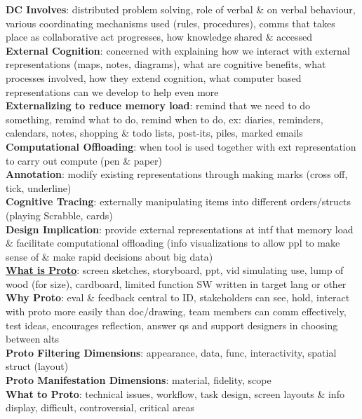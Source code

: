 \documentclass[a4paper]{article}
\begin{document}
\begin{multicols}{3}
        \textbf{DC Involves}: distributed problem solving, role of verbal \& on verbal behaviour, various coordinating mechanisms used (rules, procedures), comms that takes place as collaborative act progresses, how knowledge shared \& accessed\\
        \textbf{External Cognition}: concerned with explaining how we interact with external representations (maps, notes, diagrams), what are cognitive benefits, what processes involved, how they extend cognition, what computer based representations can we develop to help even more\\
        \textbf{Externalizing to reduce memory load}: remind that we need to do something, remind what to do, remind when to do, ex: diaries, reminders, calendars, notes, shopping \& todo lists, post-its, piles, marked emails\\
        \textbf{Computational Offloading}: when tool is used together with ext representation to carry out compute (pen \& paper)\\
        \textbf{Annotation}: modify existing representations through making marks (cross off, tick, underline)\\
        \textbf{Cognitive Tracing}: externally manipulating items into different orders/structs (playing Scrabble, cards)\\
        \textbf{Design Implication}: provide external representations at intf that memory load \& facilitate computational offloading (info visualizations to allow ppl to make sense of \& make rapid decisions about big data)\\
        \underline{\textbf{What is Proto}}: screen sketches, storyboard, ppt, vid simulating use, lump of wood (for size), cardboard, limited function SW written in target lang or other\\
        \textbf{Why Proto}: eval \& feedback central to ID, stakeholders can see, hold, interact with proto more easily than doc/drawing, team members can comm effectively, test ideas, encourages reflection, answer qs and support designers in choosing between alts\\
        \textbf{Proto Filtering Dimensions}: appearance, data, func, interactivity, spatial struct (layout)\\
        \textbf{Proto Manifestation Dimensions}: material, fidelity, scope\\
        \textbf{What to Proto}: technical issues, workflow, task design, screen layouts \& info display, difficult, controversial, critical areas\\

\end{multicols}
\end{document}
